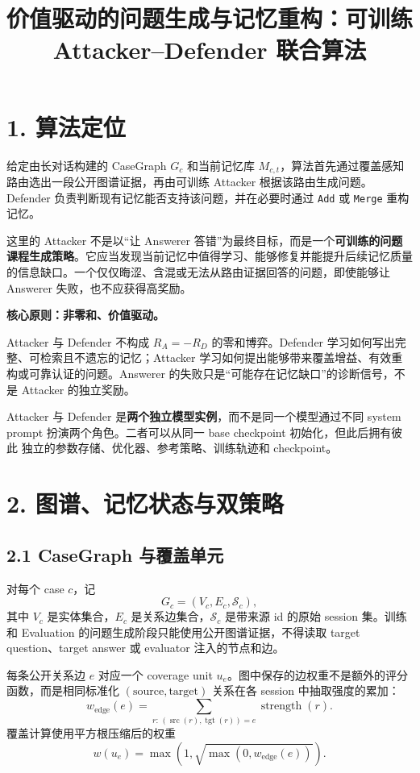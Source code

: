 \documentclass[a4paper,11pt]{article}
\title{\textbf{价值驱动的问题生成与记忆重构：可训练 Attacker--Defender 联合算法}}
\author{}
\date{}
\begin{document}
\maketitle

\section*{1. 算法定位}

给定由长对话构建的 CaseGraph $G_c$ 和当前记忆库 $M_{c,t}$，算法首先通过覆盖感知路由选出一段公开图谱证据，再由可训练 Attacker 根据该路由生成问题。Defender 负责判断现有记忆能否支持该问题，并在必要时通过 \texttt{Add} 或 \texttt{Merge} 重构记忆。

这里的 Attacker 不是以“让 Answerer 答错”为最终目标，而是一个\textbf{可训练的问题课程生成策略}。它应当发现当前记忆中值得学习、能够修复并能提升后续记忆质量的信息缺口。一个仅仅晦涩、含混或无法从路由证据回答的问题，即使能够让 Answerer 失败，也不应获得高奖励。

\begin{implbox}
\textbf{核心原则：非零和、价值驱动。}

Attacker 与 Defender 不构成 $R_A=-R_D$ 的零和博弈。Defender 学习如何写出完整、可检索且不遗忘的记忆；Attacker 学习如何提出能够带来覆盖增益、有效重构或可靠认证的问题。Answerer 的失败只是“可能存在记忆缺口”的诊断信号，不是 Attacker 的独立奖励。

Attacker 与 Defender 是\textbf{两个独立模型实例}，而不是同一个模型通过不同
system prompt 扮演两个角色。二者可以从同一 base checkpoint 初始化，但此后拥有彼此
独立的参数存储、优化器、参考策略、训练轨迹和 checkpoint。
\end{implbox}

\section*{2. 图谱、记忆状态与双策略}

\subsection*{2.1 CaseGraph 与覆盖单元}

对每个 case $c$，记
\[
    G_c=(V_c,E_c,\mathcal{S}_c),
\]
其中 $V_c$ 是实体集合，$E_c$ 是关系边集合，$\mathcal{S}_c$ 是带来源 id 的原始 session 集。训练和 Evaluation 的问题生成阶段只能使用公开图谱证据，不得读取 target question、target answer 或 evaluator 注入的节点和边。

每条公开关系边 $e$ 对应一个 coverage unit $u_e$。图中保存的边权重不是额外的评分函数，而是相同标准化 $(\text{source},\text{target})$ 关系在各 session 中抽取强度的累加：
\[
    w_{\mathrm{edge}}(e)
    =\sum_{r:\,(\operatorname{src}(r),\operatorname{tgt}(r))=e}
    \operatorname{strength}(r).
\]
覆盖计算使用平方根压缩后的权重
\[
    w(u_e)=
    \max\!\left(1,\sqrt{\max(0,w_{\mathrm{edge}}(e))}\right).
\]
\end{document}

